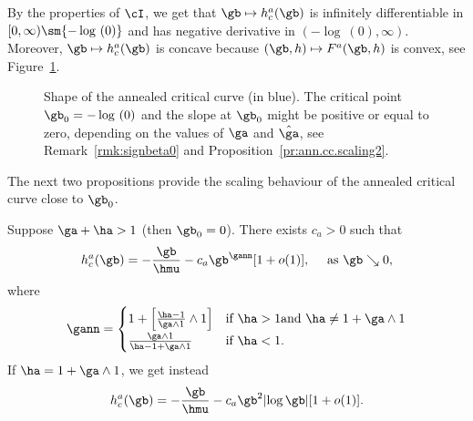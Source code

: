 By the properties of $\cI$, we get that $\gb \mapsto h_c^a(\gb)$ is infinitely differentiable in $[0,\infty) \sm \{- \log~(0)\}$ and has negative derivative in $(- \log~(0),\infty)$. Moreover, $\gb \mapsto h_c^a(\gb)$ is concave because $(\gb,h) \mapsto F^a(\gb,h)$ is convex, see Figure~\ref{fig.ann.cc}.

\begin{figure}
\begin{center}
\end{center}
\caption{\label{fig.ann.cc}
Shape of the annealed critical curve (in blue). The critical point $\gb_0 = -\log~(0)$ and the slope at $\gb_0$ might be positive or equal to zero, depending on the values of $\ga$ and $\hat\ga$, see Remark~\ref{rmk:signbeta0} and Proposition~\ref{pr:ann.cc.scaling2}.}
\end{figure}

The next two propositions provide the scaling behaviour of the annealed critical curve close to $\gb_0$.

\begin{prop}\label{pr:ann.cc.scaling}
Suppose $\ga + \ha > 1$ (then $\gb_0 = 0$). There exists $c_a > 0$ such that
\begin{equation}
h_c^a(\gb) = - \frac{\gb}{\hmu} - c_a \gb^{\gann}[1 + o(1)], \quad \text{ as }\gb \searrow 0,
\end{equation}
where
\begin{equation}\label{eq:defgann}
\gann =
\begin{cases}
1 + \left[\frac{\ha -1}{\ga \wedge 1} \wedge 1 \right] & \text{if } \ha > 1 \text{and } \ha \neq 1 + \ga \wedge 1\\[0.3em]
\frac{\ga \wedge 1}{\ha -1 + \ga \wedge 1} & \text{if } \ha < 1.
\end{cases}
\end{equation}
If $\ha = 1 + \ga \wedge 1$, we get instead
\begin{equation}
h_c^a(\gb) = - \frac{\gb}{\hmu} - c_a \gb^2 |{\log \gb}|[1 + o(1)].
\end{equation}
\end{prop}

